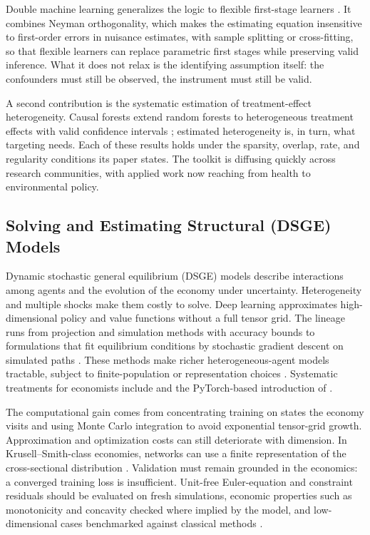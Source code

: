 \documentclass[12pt]{article}
\theoremstyle{plain}
\theoremstyle{definition}
\theoremstyle{remark}
\begin{document}
Double machine learning generalizes the logic to flexible first-stage
learners \citep{Chernozhukov2018}. It combines Neyman orthogonality,
which makes the estimating equation insensitive to first-order errors
in nuisance estimates, with sample splitting or cross-fitting, so that
flexible learners can replace parametric first stages while preserving
valid inference. What it does not
relax is the identifying assumption itself: the confounders must still
be observed, the instrument must still be valid.

A second contribution is the systematic estimation of treatment-effect
heterogeneity. Causal forests extend random forests to heterogeneous
treatment effects with valid confidence intervals \citep{Wager2018};
estimated heterogeneity is, in turn, what targeting needs. Each of these
results holds under the sparsity,
overlap, rate, and regularity conditions its paper states. The toolkit is diffusing quickly across
research communities, with applied work now reaching from health to
environmental policy.

\subsection{Solving and Estimating Structural (DSGE) Models}\label{subsec:structural}

Dynamic stochastic general equilibrium (DSGE) models describe
interactions among agents and the evolution of the economy under
uncertainty. Heterogeneity and multiple shocks make them costly to
solve. Deep learning approximates high-dimensional policy and value
functions without a full tensor grid. The lineage runs from projection
and simulation methods with accuracy bounds
\citep{JuddMaliarMaliar2017} to formulations that fit equilibrium
conditions by stochastic gradient descent on simulated paths
\citep{MaliarMaliarWinant2021}. These methods make richer
heterogeneous-agent models tractable, subject to finite-population or
representation choices \citep{Azinovic2022}.
Systematic treatments for economists include
\citet{FernandezVillaverdeEtAl2024} and the PyTorch-based introduction
of \citet{Feng2025}.

The computational gain comes from concentrating training on states the
economy visits and using Monte Carlo integration to avoid exponential
tensor-grid growth. Approximation and optimization costs can still
deteriorate with dimension. In Krusell--Smith-class economies, networks
can use a finite representation of the cross-sectional distribution
\citep{Azinovic2022}. Validation must remain grounded in the economics:
a converged training loss is insufficient. Unit-free Euler-equation and
constraint residuals should be evaluated on fresh simulations, economic
properties such as monotonicity and concavity checked where implied by
the model, and low-dimensional cases benchmarked against classical
methods \citep{JuddMaliarMaliar2017}.
\end{document}
